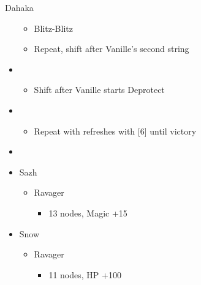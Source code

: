 \begin{multicols}{2}
\begin{battle}[1:30]{Dahaka}
\begin{itemize}
			      \begin{itemize}
				      \item Blitz-Blitz
				      \item Repeat, shift after Vanille's second string
			      \end{itemize}
			\item \fifth
			      \begin{itemize}
				      \item Shift after Vanille starts Deprotect
			      \end{itemize}
			\item \fourth
			      \begin{itemize}
				      \item Repeat with refreshes with [6] until victory
			      \end{itemize}
		\end{itemize}
	\end{battle}
	\begin{menu}
		\begin{itemize}
			\paradigm
			\begin{itemize}
				\item {}%
				      {}%
				      {\paradigmline{(\rav)}{\rav}{\rav}}%
				      {\paradigmline{\rav}{(\rav)}{(\med)}}%
				      {\paradigmline{\com}{\com}{(\med)}}%
				      {\paradigmline[5]{\textit{\rav}}{\textit{(\rav)}}{\textit{\sab}}}%
				      {\paradigmline{\com}{\com}{\rav}}
			\end{itemize}
			\crystarium
			\begin{itemize}
				\item Sazh
				      \begin{itemize}
					      \item Ravager
					            \begin{itemize}
						            \item 13 nodes, Magic +15
					            \end{itemize}
				      \end{itemize}
				\item Snow
				      \begin{itemize}
					      \item Ravager
					            \begin{itemize}
						            \item 11 nodes, HP +100
					            \end{itemize}

\end{itemize}
\end{itemize}
\end{itemize}
\end{menu}
\end{multicols}
